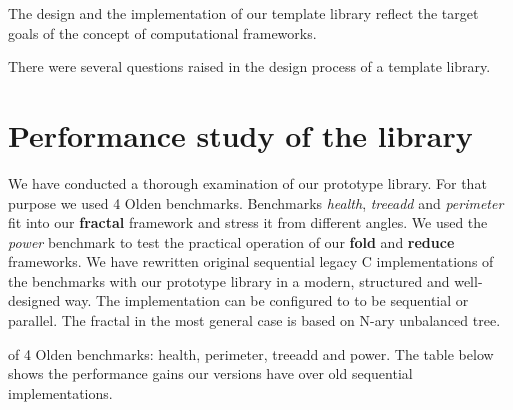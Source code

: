\quad The design and the implementation of our template library reflect the target goals of the concept of computational frameworks.    

\quad There were several questions raised in the design process of a template library. 

\section{Performance study of the library}
\label{frameworks_performance_study}
\quad We have conducted a thorough examination of our prototype library. For that purpose we used 4 Olden benchmarks. Benchmarks \textit{health}, \textit{treeadd} and \textit{perimeter} fit into our \textbf{fractal} framework and stress it from different angles. We used the \textit{power} benchmark to test the practical operation of our \textbf{fold} and \textbf{reduce} frameworks.\newline\null
\quad We have rewritten original sequential legacy C implementations of the benchmarks with our prototype library in a modern, structured and well-designed way. The implementation can be configured to to be sequential or parallel. The fractal in the most general case is based on N-ary unbalanced tree.   


of 4 Olden benchmarks: health, perimeter, treeadd and power. The table below shows the performance gains our versions have over old sequential implementations.   




